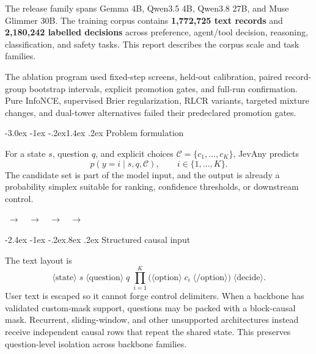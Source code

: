 \documentclass[10pt]{article}
\makeatletter
\renewcommand\section{\@startsection{section}{1}{\z@}%
  {-3.0ex \@plus -1ex \@minus -.2ex}{1.4ex \@plus .2ex}%
  {\color{navy}\Large\bfseries}}
\renewcommand\subsection{\@startsection{subsection}{2}{\z@}%
  {-2.4ex \@plus -1ex \@minus -.2ex}{.8ex \@plus .2ex}%
  {\color{blue}\large\bfseries}}
\makeatother
\begin{document}
The release family spans Gemma 4B, Qwen3.5 4B, Qwen3.8 27B, and Muse Glimmer
30B. The training corpus contains \textbf{1,772,725 text records} and
\textbf{2,180,242 labelled decisions} across preference, agent/tool decision,
reasoning, classification, and safety tasks. This report describes the corpus
scale and task families.

The ablation program used
fixed-step screens, held-out calibration, paired record-group bootstrap intervals,
explicit promotion gates, and full-run confirmation. Pure InfoNCE, supervised
Brier regularization, RLCR variants, targeted mixture changes, and dual-tower
alternatives failed their predeclared promotion gates.

\section{Problem formulation}

For a state $s$, question $q$, and explicit choices
$\mathcal{C}=\{c_1,\ldots,c_K\}$, JevAny predicts
\[
  p(y=i\mid s,q,\mathcal{C}), \qquad i\in\{1,\ldots,K\}.
\]
The candidate set is part of the model input, and the output is already a
probability simplex suitable for ranking, confidence thresholds, or downstream
control.

\begin{center}
$\;\longrightarrow\;$
$\;\longrightarrow\;$
$\;\longrightarrow\;$
$\;\longrightarrow\;$
\end{center}

\subsection{Structured causal input}

The text layout is
\[
\langle\mathrm{state}\rangle\;s\;
\langle\mathrm{question}\rangle\;q\;
\prod_{i=1}^{K}\bigl(\langle\mathrm{option}\rangle\;c_i\;
\langle/\mathrm{option}\rangle\bigr)\;
\langle\mathrm{decide}\rangle.
\]
User text is escaped so it cannot forge control delimiters. When a backbone has
validated custom-mask support, questions may be packed with a block-causal mask.
Recurrent, sliding-window, and other unsupported architectures instead receive
independent causal rows that repeat the shared state. This preserves
question-level isolation across backbone families.
\end{document}
